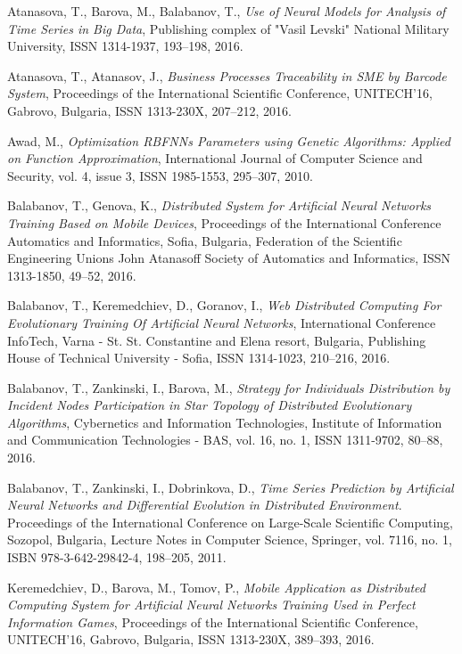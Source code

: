 \documentclass{llncs}
\begin{document}
\begin{thebibliography}{99}

 Atanasova, T., Barova, M., Balabanov, T., \textit{Use of Neural Models for Analysis of Time Series in Big Data}, Publishing complex of "Vasil Levski" National Military University, ISSN 1314-1937, 193--198, 2016.

 Atanasova, T., Atanasov, J., \textit{Business Processes Traceability in SME by Barcode System}, Proceedings of the International Scientific Conference, UNITECH’16, Gabrovo, Bulgaria, ISSN 1313-230X,  207--212, 2016.

 Awad, M., \textit{Optimization RBFNNs Parameters using Genetic Algorithms: Applied on Function Approximation}, International Journal of Computer Science and Security, vol. 4, issue 3, ISSN 1985-1553, 295--307, 2010.

 Balabanov, T., Genova, K., \textit{Distributed System for Artificial Neural Networks Training Based on Mobile Devices}, Proceedings of the International Conference Automatics and Informatics, Sofia, Bulgaria, Federation of the Scientific Engineering Unions John Atanasoff Society of Automatics and Informatics, ISSN 1313-1850, 49--52, 2016.

 Balabanov, T., Keremedchiev, D., Goranov, I., \textit{Web Distributed Computing For Evolutionary Training Of Artificial Neural Networks}, International Conference InfoTech, Varna - St. St. Constantine and Elena resort, Bulgaria, Publishing House of Technical University - Sofia, ISSN 1314-1023, 210--216, 2016.

 Balabanov, T., Zankinski, I., Barova, M., \textit{Strategy for Individuals Distribution by Incident Nodes Participation in Star Topology of Distributed Evolutionary Algorithms}, Cybernetics and Information Technologies, Institute of Information and Communication Technologies - BAS, vol. 16, no. 1, ISSN 1311-9702, 80--88, 2016.

 Balabanov, T., Zankinski, I., Dobrinkova, D., \textit{Time Series Prediction by Artificial Neural Networks and Differential Evolution in Distributed Environment}. Proceedings of the International Conference on Large-Scale Scientific Computing, Sozopol, Bulgaria, Lecture Notes in Computer Science, Springer, vol. 7116, no. 1, ISBN 978-3-642-29842-4, 198–205, 2011. 

 Keremedchiev, D., Barova, M., Tomov, P., \textit{Mobile Application as Distributed Computing System for Artificial Neural Networks Training Used in Perfect Information Games}, Proceedings of the International Scientific Conference, UNITECH’16, Gabrovo, Bulgaria, ISSN 1313-230X, 389--393, 2016.


\end{thebibliography}
\end{document}
